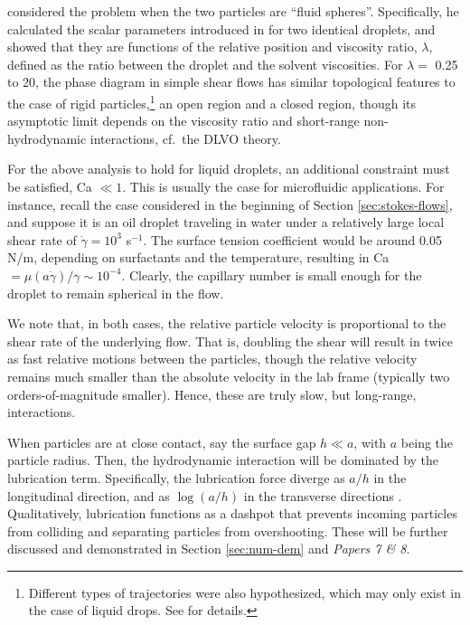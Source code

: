 \cite{Zinchenko1983,Zinchenko1984} considered the problem when the two particles are ``fluid spheres''.
Specifically, he calculated the scalar parameters introduced in \cite{batchelor_green_1972} for two identical droplets, and showed that they are functions of the relative position and viscosity ratio, $\lambda$, defined as the ratio between the droplet and the solvent viscosities.
For $\lambda=$ 0.25 to 20, the phase diagram  in simple shear flows has similar topological features to the case of rigid particles,\footnote{Different types of trajectories were also hypothesized, which may only exist in the case of liquid drops. See \cite{Zinchenko1984} for details.} \ie an open region and a closed region, though its asymptotic limit depends on the viscosity ratio and short-range non-hydrodynamic interactions, cf.\ the DLVO theory.

For the above analysis to hold for liquid droplets, an additional constraint must be satisfied, \ie Ca $\ll 1$.
This is usually the case for microfluidic applications. For instance, recall the case considered in the beginning of Section \ref{sec:stokes-flows}, and suppose it is an oil droplet traveling in water under a relatively large local shear rate of $\dot{\gamma}=10^3$ s$^{-1}$. The surface tension coefficient would be around 0.05 N/m, depending on surfactants and the temperature, resulting in Ca $=\mu(a\dot{\gamma})/\gamma \sim 10^{-4}$. Clearly, the capillary number is small enough for the droplet to remain spherical in the flow.

We note that, in both cases, the relative particle velocity is proportional to the shear rate of the underlying flow. That is, doubling the shear will result in twice as fast relative motions between the particles, though the relative velocity remains much smaller than the absolute velocity in the lab frame (typically two orders-of-magnitude smaller). Hence, these are truly slow, but long-range, interactions.

When particles are at close contact, say the surface gap $h \ll a$, with $a$ being the particle radius. Then, the hydrodynamic interaction will be dominated by the lubrication term. Specifically, the lubrication force diverge as $a/h$ in the longitudinal direction, and as $\log(a/h)$ in the transverse directions \citep{jeffrey_onishi_1984, jeffrey1992}. Qualitatively, lubrication functions as a dashpot that prevents incoming particles from colliding and separating particles from overshooting. These will be further discussed and demonstrated in Section \ref{sec:num-dem} and \emph{Papers 7 \& 8}.


